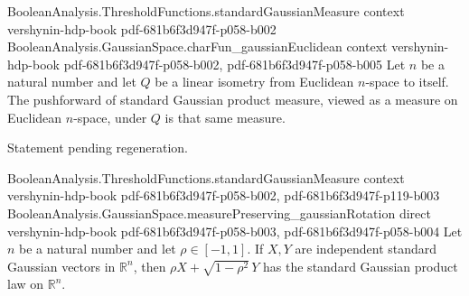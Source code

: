 \begin{lemma}
\label{BooleanAnalysis.GaussianSpace.measurePreserving_gaussianEuclideanIsometry}
\leanok
{}
\proofstep
  {BooleanAnalysis.ThresholdFunctions.standardGaussianMeasure}
  {context}
  {vershynin-hdp-book}
  {pdf-681b6f3d947f-p058-b002}
\proofstep
  {BooleanAnalysis.GaussianSpace.charFun_gaussianEuclidean}
  {context}
  {vershynin-hdp-book}
  {pdf-681b6f3d947f-p058-b002,
    pdf-681b6f3d947f-p058-b005}
Let $n$ be a natural number and let $Q$ be a linear isometry from Euclidean $n$-space to
itself. The pushforward of standard Gaussian product measure, viewed as a measure on
Euclidean $n$-space, under $Q$ is that same measure.
\end{lemma}

\begin{lemma}
\label{BooleanAnalysis.GaussianSpace.measurePreserving_gaussianIsometry}
\leanok
{}
Statement pending regeneration.
\end{lemma}

\begin{lemma}
\label{BooleanAnalysis.GaussianSpace.measurePreserving_gaussianEndpoint}
\leanok
{}
\proofstep
  {BooleanAnalysis.ThresholdFunctions.standardGaussianMeasure}
  {context}
  {vershynin-hdp-book}
  {pdf-681b6f3d947f-p058-b002,
    pdf-681b6f3d947f-p119-b003}
\proofstep
  {BooleanAnalysis.GaussianSpace.measurePreserving_gaussianRotation}
  {direct}
  {vershynin-hdp-book}
  {pdf-681b6f3d947f-p058-b003,
    pdf-681b6f3d947f-p058-b004}
Let $n$ be a natural number and let $\rho\in[-1,1]$. If $X,Y$ are independent standard
Gaussian vectors in $\mathbb R^n$, then $\rho X+\sqrt{1-\rho^2}\,Y$ has the standard
Gaussian product law on $\mathbb R^n$.
\end{lemma}

